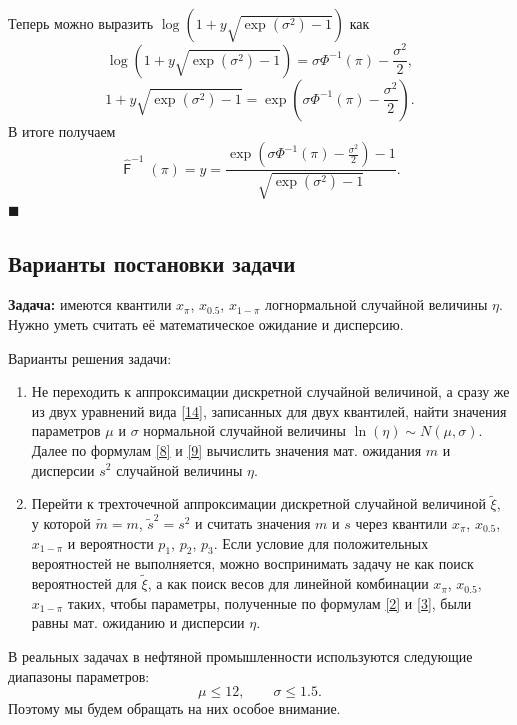 \documentclass[12pt]{article}
\newenvironment{Proof}{\par\noindent{\bf Доказательство.}}{\hfill$\scriptstyle\blacksquare$}
\DeclareMathOperator{\F}{\mathsf{F}}
\begin{document}
\begin{Proof}
	Теперь можно выразить $\log(1+y\sqrt{\exp(\sigma ^{2})-1})$ как
	\begin{equation*}
		\displaystyle{\log(1+y\sqrt{\exp(\sigma ^{2})-1}) = \sigma\Phi^{-1}(\pi) - \frac{\sigma^{2} }{2}},
	\end{equation*}
	\begin{equation*}
		1+y\sqrt{\exp(\sigma ^{2})-1} = \exp\left( \sigma\Phi^{-1}(\pi) - \frac{\sigma^{2} }{2}\right) .
	\end{equation*}
	В итоге получаем
	\begin{equation*}
		\displaystyle{\hat{\F}^{-1}(\pi) = y = \frac{\exp(\sigma\Phi^{-1}(\pi) - \frac{\sigma^{2} }{2})-1}{\sqrt{\exp(\sigma ^{2})-1}}}.
	\end{equation*}
\end{Proof}

	\subsection{Варианты постановки задачи}

\textbf{Задача:} имеются квантили $x_{\pi}$, $x_{0.5}$, $x_{1-\pi}$ логнормальной случайной величины $\eta$. Нужно уметь считать её математическое ожидание и дисперсию.

Варианты решения задачи:
\begin{enumerate}
	\item Не переходить к аппроксимации дискретной случайной величиной, а сразу же из двух уравнений вида \eqref{14}, записанных для двух квантилей, найти значения параметров $\mu$ и $\sigma$ нормальной случайной величины $\ln(\eta)\sim N(\mu, \sigma)$. Далее по формулам \eqref{8} и \eqref{9} вычислить значения мат. ожидания $m$ и дисперсии $s^{2}$ случайной величины $\eta$.
	\item Перейти к трехточечной аппроксимации дискретной случайной величиной $\tilde{\xi}$, у которой $\tilde{m} = m$, $\tilde{s}^{2}=s^{2}$ и считать значения $m$ и $s$ через квантили $x_{\pi}$, $x_{0.5}$, $x_{1-\pi}$ и вероятности $p_{1}$, $p_{2}$, $p_{3}$.
	Если условие для положительных вероятностей не выполняется, можно воспринимать задачу не как поиск вероятностей для $\tilde{\xi}$, а как поиск весов для линейной комбинации $x_{\pi}$, $x_{0.5}$, $x_{1-\pi}$ таких, чтобы параметры, полученные по формулам \eqref{2} и \eqref{3}, были равны мат. ожиданию и дисперсии $\eta$. 
\end{enumerate}

В реальных задачах в нефтяной промышленности используются следующие диапазоны параметров:
\[\mu\leq12, \quad\quad \sigma\leq1.5.\]
Поэтому мы будем обращать на них особое внимание.
	
\end{document}

